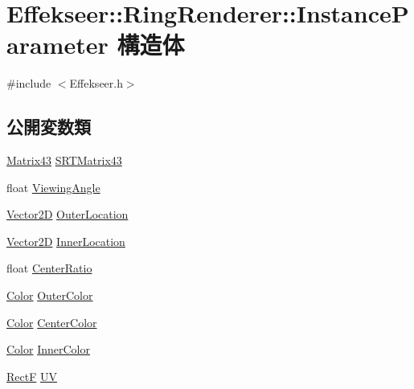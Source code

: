 \hypertarget{struct_effekseer_1_1_ring_renderer_1_1_instance_parameter}{}\section{Effekseer\+:\+:Ring\+Renderer\+:\+:Instance\+Parameter 構造体}
\label{struct_effekseer_1_1_ring_renderer_1_1_instance_parameter}


{\ttfamily \#include $<$Effekseer.\+h$>$}

\subsection*{公開変数類}
\begin{DoxyCompactItemize}
\item 
\mbox{\hyperlink{struct_effekseer_1_1_matrix43}{Matrix43}} \mbox{\hyperlink{struct_effekseer_1_1_ring_renderer_1_1_instance_parameter_abf4c46b9d970713d7b0b24937b0068aa}{S\+R\+T\+Matrix43}}
\item 
float \mbox{\hyperlink{struct_effekseer_1_1_ring_renderer_1_1_instance_parameter_a6190409d348a699ca3959fb9416ad0a3}{Viewing\+Angle}}
\item 
\mbox{\hyperlink{struct_effekseer_1_1_vector2_d}{Vector2D}} \mbox{\hyperlink{struct_effekseer_1_1_ring_renderer_1_1_instance_parameter_a4cec1a47e29e3223e61b9ca6321ea418}{Outer\+Location}}
\item 
\mbox{\hyperlink{struct_effekseer_1_1_vector2_d}{Vector2D}} \mbox{\hyperlink{struct_effekseer_1_1_ring_renderer_1_1_instance_parameter_a968473abb25d344fc44f94c932778118}{Inner\+Location}}
\item 
float \mbox{\hyperlink{struct_effekseer_1_1_ring_renderer_1_1_instance_parameter_ac6d815e9e994b7cd7aed0a10ac27fa83}{Center\+Ratio}}
\item 
\mbox{\hyperlink{struct_effekseer_1_1_color}{Color}} \mbox{\hyperlink{struct_effekseer_1_1_ring_renderer_1_1_instance_parameter_a1ec6e9ee1f8609946d311f32775b94e5}{Outer\+Color}}
\item 
\mbox{\hyperlink{struct_effekseer_1_1_color}{Color}} \mbox{\hyperlink{struct_effekseer_1_1_ring_renderer_1_1_instance_parameter_a09f1fa6d5c759274a99f7989d91ac247}{Center\+Color}}
\item 
\mbox{\hyperlink{struct_effekseer_1_1_color}{Color}} \mbox{\hyperlink{struct_effekseer_1_1_ring_renderer_1_1_instance_parameter_ab6b70b8bbd4afb32a90dbc30789519dd}{Inner\+Color}}
\item 
\mbox{\hyperlink{struct_effekseer_1_1_rect_f}{RectF}} \mbox{\hyperlink{struct_effekseer_1_1_ring_renderer_1_1_instance_parameter_a827916d62b80594e49b2b521df6ca822}{UV}}
\end{DoxyCompactItemize}


